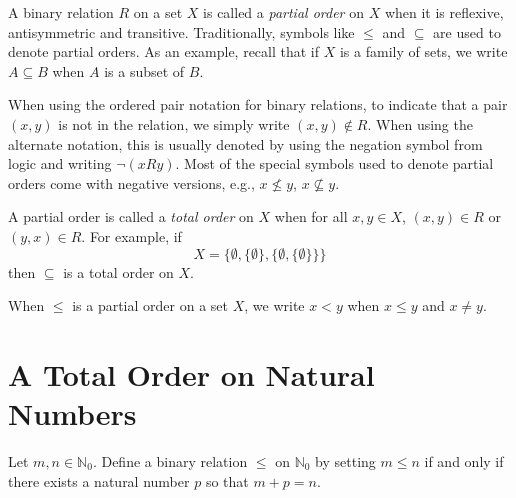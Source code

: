 A binary relation $R$ on a set $X$ is called a \textit{partial order} on
$X$ when it is reflexive, antisymmetric and transitive.
Traditionally, symbols like $\le$ and $\subseteq$ are used to denote
partial orders.  As an example, recall that if $X$ is a family of sets, 
we write $A\subseteq B$ when $A$ is a subset of $B$.  

When using the ordered pair notation for binary relations,
to indicate that a pair $(x,y)$ is not in the relation,
we simply write $(x,y)\notin R$. When using the alternate
notation, this is usually denoted by using the negation
symbol from logic and writing $\lnot (xRy)$.  Most of the
special symbols used to denote partial orders 
come with negative versions, e.g., $x\not\le y$, $x\nsubseteq y$.

A partial order is called a \textit{total order} on $X$ when for
all $x,y\in X$, $(x,y)\in R$ or $(y,x)\in R$.  For example,
if 
\[
X=\{\emptyset,\{\emptyset\},\{\emptyset,\{\emptyset\}\}\}
\]
then $\subseteq$ is a total order on $X$.

When $\le$ is a partial order on a set $X$, we write
$x<y$ when $x\le y$ and $x\neq y$.

\section{A Total Order on Natural Numbers}

Let $m,n\in \mathbb{N}_0$. Define a binary relation $\le$ on
$\mathbb{N}_0$ by setting $m\le n$ if and only if
there exists a natural number $p$ so
that $m+p=n$.  

